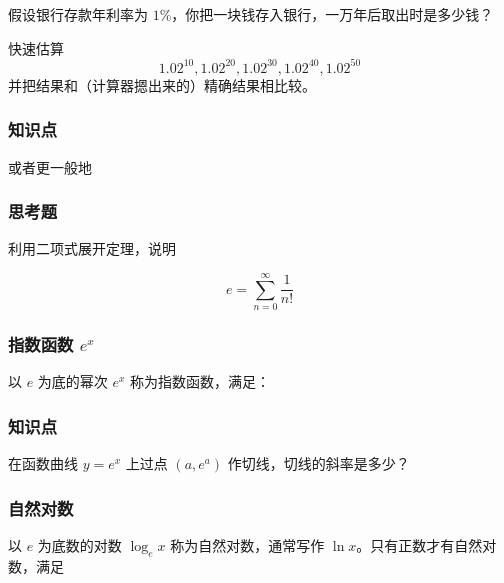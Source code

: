 \documentclass[CJK,13pt]{beamer}
\date{}
\begin{document}
  \bch


\begin{frame}

  
  假设银行存款年利率为 $1\%$，你把一块钱存入银行，一万年后取出时是多少钱？
\end{frame}

  

\begin{frame}
  快速估算
  $$ 1.02^{10}, 1.02^{20}, 1.02^{30}, 1.02^{40}, 1.02^{50}$$
  并把结果和（计算器摁出来的）精确结果相比较。
\end{frame}


\begin{frame}
  \frametitle{知识点}
  或者更一般地
\end{frame}



\begin{frame}
  \frametitle{思考题}
  利用二项式展开定理，说明

  $$e = \sum_{n=0}^\infty \frac{1}{n!} $$
\end{frame}



\begin{frame}
  \frametitle{指数函数 $e^x$}
  以 $e$ 为底的幂次 $e^x$ 称为指数函数，满足：
  
\end{frame}



\begin{frame}
  \frametitle{知识点}
\end{frame}



\begin{frame}
 在函数曲线 $y=e^x$ 上过点 $(a, e^a)$ 作切线，切线的斜率是多少？
\end{frame}




\begin{frame}
  \frametitle{自然对数}
  以 $e$ 为底数的对数 $\log_e x$ 称为自然对数，通常写作 $\ln x$。只有正数才有自然对数，满足

\end{frame}
\end{document}
